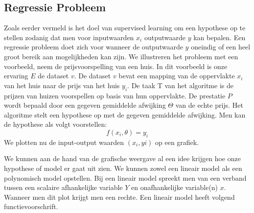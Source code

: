 \subsection{Regressie Probleem}\label{Regressie Probleem}

Zoals eerder vermeld is het doel van supervised learning om een hypothese op te stellen zodanig dat men voor inputwaarden $x_{i}$ outputwaarde $y$ kan bepalen. Een regressie probleem doet zich voor wanneer de outputwaarde $y$ oneindig of een heel groot bereik aan mogelijkheden kan zijn. We illustreren het probleem met een voorbeeld, neem de prijsvoorspelling van een huis. 
In dit voorbeeld is onze ervaring $E$ de dataset $v$. De dataset $v$ bevat een mapping van de oppervlakte $x_{i}$ van het huis naar de prijs van het huis $y_{i}$. De taak T van het algoritme is de prijzen van huizen voorspellen op basis van hun oppervlakte. De prestatie $P$ wordt bepaald door een gegeven gemiddelde afwijking $\Theta$ van de echte prijs. Het algoritme stelt een hypothese op met de gegeven gemiddelde afwijking. Men kan de hypothese als volgt voorstellen:
\[ f(x_{i},\theta) = y_{i} \] 
\newline
We plotten nu de input-output waarden $(x_{i},y{i})$ op een grafiek.
\newline
\begin{center}
\end{center}
\newline
%
 We kunnen aan de hand van de grafische weergave al een idee krijgen hoe onze hypothese of model er gaat uit zien. We kunnen zowel een lineair model als een polynomisch model opstellen. Bij een lineair model spreekt men van een verband tussen een scalaire afhankelijke variable $Y$ en onafhankelijke variable(n) $x$. Wanneer men dit plot krijgt men een rechte. Een lineair model heeft volgend functievoorschrift.
